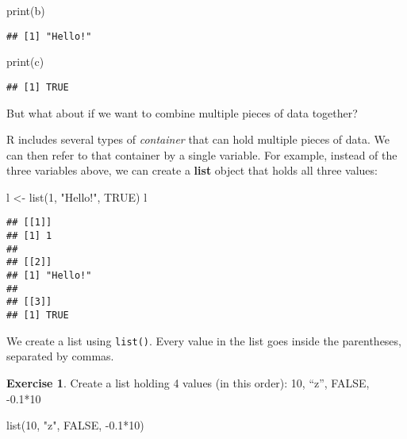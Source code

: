 \documentclass[
]{article}
\newenvironment{Shaded}{\begin{snugshade}}{\end{snugshade}}
\newcommand{\ConstantTok}[1]{\textcolor[rgb]{0.00,0.00,0.00}{#1}}
\newcommand{\DecValTok}[1]{\textcolor[rgb]{0.00,0.00,0.81}{#1}}
\newcommand{\FloatTok}[1]{\textcolor[rgb]{0.00,0.00,0.81}{#1}}
\newcommand{\FunctionTok}[1]{\textcolor[rgb]{0.00,0.00,0.00}{#1}}
\newcommand{\NormalTok}[1]{#1}
\newcommand{\OtherTok}[1]{\textcolor[rgb]{0.56,0.35,0.01}{#1}}
\newcommand{\SpecialCharTok}[1]{\textcolor[rgb]{0.00,0.00,0.00}{#1}}
\newcommand{\StringTok}[1]{\textcolor[rgb]{0.31,0.60,0.02}{#1}}
\theoremstyle{definition}
\theoremstyle{definition}
\theoremstyle{definition}
\newtheorem{exercise}{Exercise}[section]
\theoremstyle{definition}
\theoremstyle{remark}
\begin{document}
\begin{Shaded}
\begin{Highlighting}[]
\FunctionTok{print}\NormalTok{(b)}
\end{Highlighting}
\end{Shaded}

\begin{verbatim}
## [1] "Hello!"
\end{verbatim}

\begin{Shaded}
\begin{Highlighting}[]
\FunctionTok{print}\NormalTok{(c)}
\end{Highlighting}
\end{Shaded}

\begin{verbatim}
## [1] TRUE
\end{verbatim}

But what about if we want to combine multiple pieces of data together?

R includes several types of \emph{container} that can hold multiple pieces of data. We can then refer to that container by a single variable. For example, instead of the three variables above, we can create a \textbf{list} object that holds all three values:

\begin{Shaded}
\begin{Highlighting}[]
\NormalTok{l }\OtherTok{\textless{}{-}} \FunctionTok{list}\NormalTok{(}\DecValTok{1}\NormalTok{, }\StringTok{"Hello!"}\NormalTok{, }\ConstantTok{TRUE}\NormalTok{)}
\NormalTok{l}
\end{Highlighting}
\end{Shaded}

\begin{verbatim}
## [[1]]
## [1] 1
## 
## [[2]]
## [1] "Hello!"
## 
## [[3]]
## [1] TRUE
\end{verbatim}

We create a list using \texttt{list()}. Every value in the list goes inside the parentheses, separated by commas.

\begin{exercise}
Create a list holding 4 values (in this order): 10, ``z'', FALSE, -0.1*10
\end{exercise}

\begin{Shaded}
\begin{Highlighting}[]
\FunctionTok{list}\NormalTok{(}\DecValTok{10}\NormalTok{, }\StringTok{"z"}\NormalTok{, }\ConstantTok{FALSE}\NormalTok{, }\SpecialCharTok{{-}}\FloatTok{0.1}\SpecialCharTok{*}\DecValTok{10}\NormalTok{)}
\end{Highlighting}
\end{Shaded}
\end{document}
